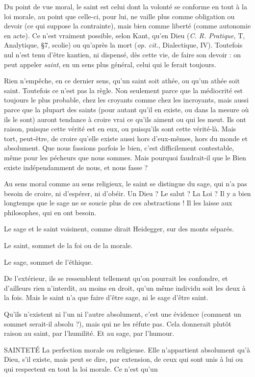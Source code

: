 Du point de vue moral, le saint est celui dont la volonté se conforme en
tout à la loi morale, au point que celle-ci, pour lui, ne vaille plus comme obligation
ou devoir (ce qui suppose la contrainte), mais bien comme liberté
(comme autonomie en acte). Ce n’est vraiment possible, selon Kant, qu’en
Dieu ({\it C. R. Pratique}, T, Analytique, \S 7, scolie) ou qu'après la mort ({\it op. cit.},
Dialectique, IV). Toutefois nul n’est tenu d’être kantien, ni dispensé, dès cette
vie, de faire son devoir : on peut appeler {\it saint}, en un sens plus général, celui qui
le ferait toujours.

Rien n'empêche, en ce dernier sens, qu’un saint soit athée, ou qu’un athée
soit saint. Toutefois ce n’est pas la règle. Non seulement parce que la médiocrité
est toujours le plus probable, chez les croyants comme chez les incroyants,
mais aussi parce que la plupart des saints (pour autant qu’il en existe, ou dans
la mesure où ils le sont) auront tendance à croire vrai ce qu’ils aiment ou qui
les meut. Ils ont raison, puisque cette vérité est en eux, ou puisqu'ils sont cette
vérité-là. Mais tort, peut-être, de croire qu’elle existe aussi hors d’eux-mêmes,
hors du monde et absolument. Que nous fassions parfois le bien, c’est difficilement
contestable, même pour les pécheurs que nous sommes. Mais pourquoi
faudrait-il que le Bien existe indépendamment de nous, et nous fasse ?

Au sens moral comme au sens religieux, le saint se distingue du sage, qui
n’a pas besoin de croire, ni d’espérer, ni d’obéir. Un Dieu ? Le salut ? La Loi ?
Il y a bien longtemps que le sage ne se soucie plus de ces abstractions ! Il les
laisse aux philosophes, qui en ont besoin.

Le sage et le saint voisinent, comme dirait Heidegger, sur des monts
séparés.

Le saint, sommet de la foi ou de la morale.

Le sage, sommet de l'éthique.

De l'extérieur, ils se ressemblent tellement qu’on pourrait les confondre, et
d’ailleurs rien n’interdit, au moins en droit, qu’un même individu soit les deux
à la fois. Mais le saint n’a que faire d’être sage, ni le sage d’être saint.

Qu'ils n'existent ni l’un ni l’autre absolument, c’est une évidence (comment
un sommet serait-il absolu ?), mais qui ne les réfute pas. Cela donnerait
plutôt raison au saint, par l'humilité. Et au sage, par l'humour.

SAINTETÉ La perfection morale ou religieuse. Elle n'appartient absolument
qu'à Dieu, s’il existe, mais peut se dire, par extension, de
ceux qui sont unis à lui ou qui respectent en tout la loi morale. Ce n’est qu’un

